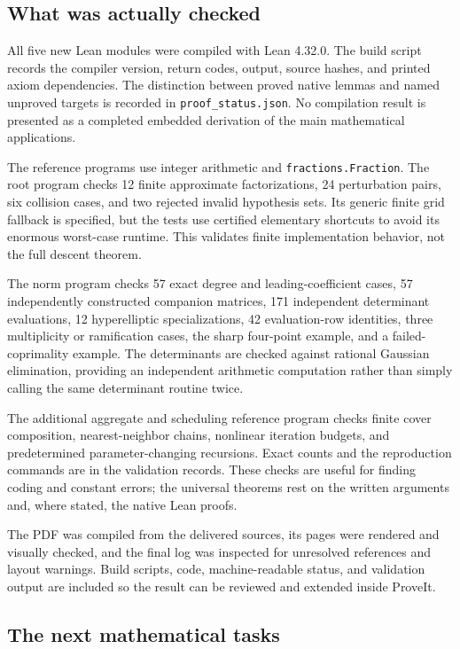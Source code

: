 \subsection{What was actually checked}

All five new Lean modules were compiled with Lean 4.32.0. The build
script records the compiler version, return codes, output, source hashes,
and printed axiom dependencies. The distinction between proved native
lemmas and named unproved targets is recorded in
\texttt{proof\_status.json}. No compilation result is presented as a
completed embedded derivation of the main mathematical applications.

The reference programs use integer arithmetic and
\texttt{fractions.Fraction}. The root program checks 12 finite
approximate factorizations, 24 perturbation pairs, six collision cases,
and two rejected invalid hypothesis sets. Its generic finite grid
fallback is specified, but the tests use certified elementary shortcuts
to avoid its enormous worst-case runtime. This validates finite
implementation behavior, not the full descent theorem.

The norm program checks 57 exact degree and leading-coefficient cases,
57 independently constructed companion matrices, 171 independent
determinant evaluations, 12 hyperelliptic specializations, 42
evaluation-row identities, three multiplicity or ramification cases,
the sharp four-point example, and a failed-coprimality example. The
determinants are checked against rational Gaussian elimination,
providing an independent arithmetic computation rather than simply
calling the same determinant routine twice.

The additional aggregate and scheduling reference program checks finite
cover composition, nearest-neighbor chains, nonlinear iteration budgets,
and predetermined parameter-changing recursions. Exact counts and the
reproduction commands are in the validation records. These checks are
useful for finding coding and constant errors; the universal theorems
rest on the written arguments and, where stated, the native Lean proofs.

The PDF was compiled from the delivered sources, its pages were rendered
and visually checked, and the final log was inspected for unresolved
references and layout warnings. Build scripts, code, machine-readable
status, and validation output are included so the result can be
reviewed and extended inside ProveIt.

\subsection{The next mathematical tasks}


